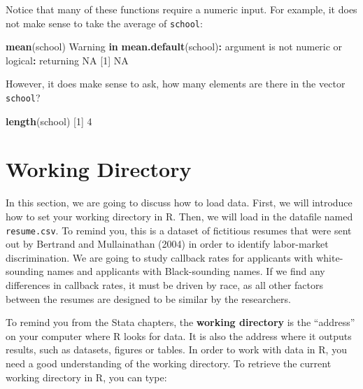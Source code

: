 \documentclass[
]{book}
\newenvironment{Shaded}{\begin{snugshade}}{\end{snugshade}}
\newcommand{\ConstantTok}[1]{\textcolor[rgb]{0.56,0.35,0.01}{#1}}
\newcommand{\ControlFlowTok}[1]{\textcolor[rgb]{0.13,0.29,0.53}{\textbf{#1}}}
\newcommand{\DecValTok}[1]{\textcolor[rgb]{0.00,0.00,0.81}{#1}}
\newcommand{\FunctionTok}[1]{\textcolor[rgb]{0.13,0.29,0.53}{\textbf{#1}}}
\newcommand{\NormalTok}[1]{#1}
\newcommand{\SpecialCharTok}[1]{\textcolor[rgb]{0.81,0.36,0.00}{\textbf{#1}}}
\begin{document}
Notice that many of these functions require a numeric input. For example, it does not make sense to take the average of \texttt{school}:

\begin{Shaded}
\begin{Highlighting}[]
\FunctionTok{mean}\NormalTok{(school)}
\NormalTok{Warning }\ControlFlowTok{in} \FunctionTok{mean.default}\NormalTok{(school)}\SpecialCharTok{:}\NormalTok{ argument is not numeric or}
\NormalTok{logical}\SpecialCharTok{:}\NormalTok{ returning }\ConstantTok{NA}
\NormalTok{[}\DecValTok{1}\NormalTok{] }\ConstantTok{NA}
\end{Highlighting}
\end{Shaded}

However, it does make sense to ask, how many elements are there in the vector \texttt{school}?

\begin{Shaded}
\begin{Highlighting}[]
\FunctionTok{length}\NormalTok{(school)}
\NormalTok{[}\DecValTok{1}\NormalTok{] }\DecValTok{4}
\end{Highlighting}
\end{Shaded}

\section{Working Directory}\label{working-directory-1}

In this section, we are going to discuss how to load data. First, we will introduce how to set your working directory in R. Then, we will load in the datafile named \texttt{resume.csv}. To remind you, this is a dataset of fictitious resumes that were sent out by Bertrand and Mullainathan (2004) in order to identify labor-market discrimination. We are going to study callback rates for applicants with white-sounding names and applicants with Black-sounding names. If we find any differences in callback rates, it must be driven by race, as all other factors between the resumes are designed to be similar by the researchers.

To remind you from the Stata chapters, the \textbf{working directory} is the ``address'' on your computer where R looks for data. It is also the address where it outputs results, such as datasets, figures or tables. In order to work with data in R, you need a good understanding of the working directory. To retrieve the current working directory in R, you can type:
\end{document}
